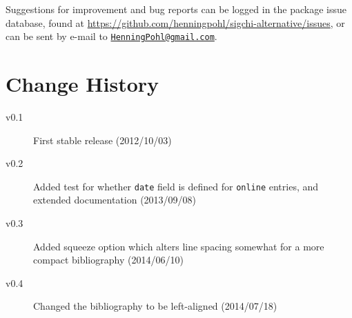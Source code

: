 \documentclass[a4paper]{ltxdoc}
\begin{document}
Suggestions for improvement and bug reports can be logged in the package
issue database, found at 
\url{https://github.com/henningpohl/sigchi-alternative/issues}, 
or can be sent by e-mail to 
\href{mailto:HenningPohl@gmail.com}{\texttt{HenningPohl@gmail.com}}.

\nocite{*}
\printbibliography

\section*{Change History}
\begin{multicols}{2}
\begin{description}
  \item[v0.1] First stable release (2012/10/03)
  \item[v0.2] Added test for whether \texttt{date} field is defined for \texttt{online} entries, and extended documentation (2013/09/08)
  \item[v0.3] Added squeeze option which alters line spacing somewhat for a more compact bibliography (2014/06/10)
  \item[v0.4] Changed the bibliography to be left-aligned (2014/07/18)
\end{description}
\end{multicols}
\end{document}
